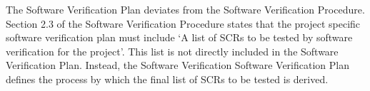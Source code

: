 The Software Verification Plan deviates from the Software Verification
Procedure. Section 2.3 of the Software Verification Procedure states that the
project specific software verification plan must include `A list of SCRs to be
tested by software verification for the project'. This list is not directly
included in the Software Verification Plan. Instead, the Software Verification
Software Verification Plan defines the process by which the final list of SCRs
to be tested is derived.
